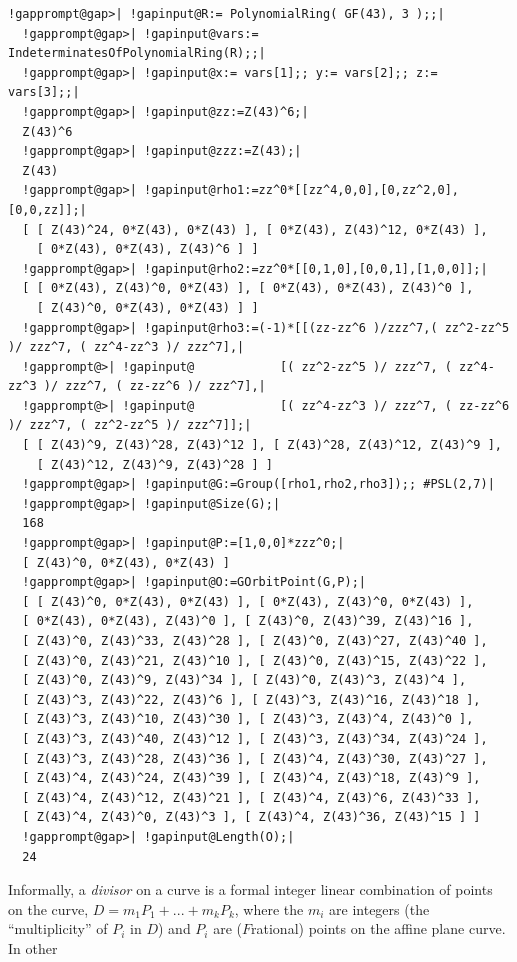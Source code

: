 \documentclass[a4paper,11pt]{report}
\begin{document}
{{ 
\begin{Verbatim}[commandchars=!@|,fontsize=\small,frame=single,label=Example]
  !gapprompt@gap>| !gapinput@R:= PolynomialRing( GF(43), 3 );;|
  !gapprompt@gap>| !gapinput@vars:= IndeterminatesOfPolynomialRing(R);;|
  !gapprompt@gap>| !gapinput@x:= vars[1];; y:= vars[2];; z:= vars[3];;|
  !gapprompt@gap>| !gapinput@zz:=Z(43)^6;|
  Z(43)^6
  !gapprompt@gap>| !gapinput@zzz:=Z(43);|
  Z(43)
  !gapprompt@gap>| !gapinput@rho1:=zz^0*[[zz^4,0,0],[0,zz^2,0],[0,0,zz]];|
  [ [ Z(43)^24, 0*Z(43), 0*Z(43) ], [ 0*Z(43), Z(43)^12, 0*Z(43) ], 
    [ 0*Z(43), 0*Z(43), Z(43)^6 ] ]
  !gapprompt@gap>| !gapinput@rho2:=zz^0*[[0,1,0],[0,0,1],[1,0,0]];|
  [ [ 0*Z(43), Z(43)^0, 0*Z(43) ], [ 0*Z(43), 0*Z(43), Z(43)^0 ], 
    [ Z(43)^0, 0*Z(43), 0*Z(43) ] ]
  !gapprompt@gap>| !gapinput@rho3:=(-1)*[[(zz-zz^6 )/zzz^7,( zz^2-zz^5 )/ zzz^7, ( zz^4-zz^3 )/ zzz^7],|
  !gapprompt@>| !gapinput@            [( zz^2-zz^5 )/ zzz^7, ( zz^4-zz^3 )/ zzz^7, ( zz-zz^6 )/ zzz^7],|
  !gapprompt@>| !gapinput@            [( zz^4-zz^3 )/ zzz^7, ( zz-zz^6 )/ zzz^7, ( zz^2-zz^5 )/ zzz^7]];|
  [ [ Z(43)^9, Z(43)^28, Z(43)^12 ], [ Z(43)^28, Z(43)^12, Z(43)^9 ], 
    [ Z(43)^12, Z(43)^9, Z(43)^28 ] ]
  !gapprompt@gap>| !gapinput@G:=Group([rho1,rho2,rho3]);; #PSL(2,7)|
  !gapprompt@gap>| !gapinput@Size(G);|
  168
  !gapprompt@gap>| !gapinput@P:=[1,0,0]*zzz^0;|
  [ Z(43)^0, 0*Z(43), 0*Z(43) ]
  !gapprompt@gap>| !gapinput@O:=GOrbitPoint(G,P);|
  [ [ Z(43)^0, 0*Z(43), 0*Z(43) ], [ 0*Z(43), Z(43)^0, 0*Z(43) ], 
  [ 0*Z(43), 0*Z(43), Z(43)^0 ], [ Z(43)^0, Z(43)^39, Z(43)^16 ], 
  [ Z(43)^0, Z(43)^33, Z(43)^28 ], [ Z(43)^0, Z(43)^27, Z(43)^40 ],
  [ Z(43)^0, Z(43)^21, Z(43)^10 ], [ Z(43)^0, Z(43)^15, Z(43)^22 ], 
  [ Z(43)^0, Z(43)^9, Z(43)^34 ], [ Z(43)^0, Z(43)^3, Z(43)^4 ], 
  [ Z(43)^3, Z(43)^22, Z(43)^6 ], [ Z(43)^3, Z(43)^16, Z(43)^18 ],
  [ Z(43)^3, Z(43)^10, Z(43)^30 ], [ Z(43)^3, Z(43)^4, Z(43)^0 ], 
  [ Z(43)^3, Z(43)^40, Z(43)^12 ], [ Z(43)^3, Z(43)^34, Z(43)^24 ], 
  [ Z(43)^3, Z(43)^28, Z(43)^36 ], [ Z(43)^4, Z(43)^30, Z(43)^27 ],
  [ Z(43)^4, Z(43)^24, Z(43)^39 ], [ Z(43)^4, Z(43)^18, Z(43)^9 ], 
  [ Z(43)^4, Z(43)^12, Z(43)^21 ], [ Z(43)^4, Z(43)^6, Z(43)^33 ], 
  [ Z(43)^4, Z(43)^0, Z(43)^3 ], [ Z(43)^4, Z(43)^36, Z(43)^15 ] ]
  !gapprompt@gap>| !gapinput@Length(O);|
  24
\end{Verbatim}
 Informally, a \emph{divisor}  on a curve is a formal integer linear combination of points on the curve, $D=m_1P_1+...+m_kP_k$, where the $m_i$ are integers (the ``multiplicity'' of $P_i$ in $D$) and $P_i$ are ($F$\texttt{}rational) points on the affine plane curve. In other
}}
\end{document}
